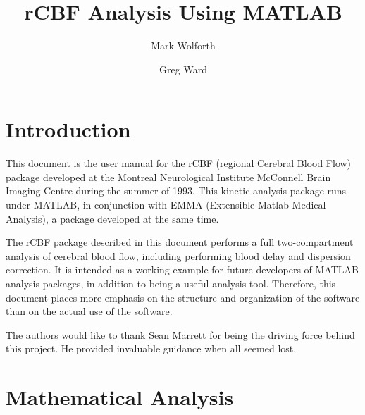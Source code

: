 
\title{rCBF Analysis Using MATLAB}
\author{Mark Wolforth \and Greg Ward}
\psdraft
\def\code#1{{\tt #1}}


\def\ttlabel#1{{\tt #1}: }
\newenvironment{ttdescription}[1]
{\begin{list}{}{\labelsep=-0.25in\rightmargin=0.25in\leftmargin=#1\addtolength{\leftmargin}{0.25in}\labelwidth=\leftmargin\let\makelabel\ttlabel}}{\end{list}}





\maketitle

\tableofcontents

\newpage
\section{Introduction}

This document is the user manual for the rCBF (regional Cerebral
Blood Flow) package developed at the Montreal Neurological Institute
McConnell Brain Imaging Centre during the summer of 1993.  This
kinetic analysis package runs under MATLAB, in conjunction with EMMA
(Extensible Matlab Medical Analysis), a package developed at the same
time.

The rCBF package described in this document performs a full
two-compartment analysis of cerebral blood flow, including performing
blood delay and dispersion correction.  It is intended as a working
example for future developers of MATLAB analysis packages, in
addition to being a useful analysis tool.  Therefore, this document
places more emphasis on the structure and organization of the
software than on the actual use of the software.

The authors would like to thank Sean Marrett for being the driving
force behind this project.  He provided invaluable guidance when all
seemed lost.

\newpage
\section{Mathematical Analysis}

